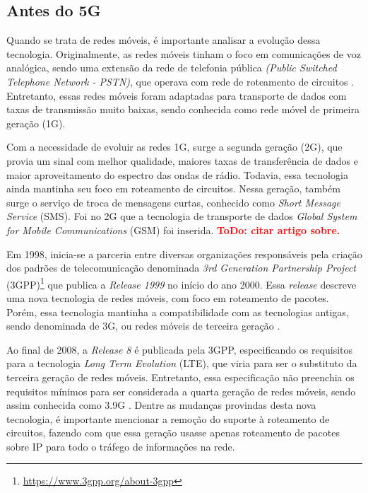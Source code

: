 \subsection{Antes do 5G}

Quando se trata de redes móveis, é importante analisar a evolução dessa tecnologia. Originalmente, as redes móveis tinham o foco em comunicações de voz analógica, sendo uma extensão da rede de telefonia pública \textit{(Public Switched Telephone Network - PSTN)}, que operava com rede de roteamento de circuitos \cite{Cardoso2020}.
Entretanto, essas redes móveis foram adaptadas para transporte de dados com taxas de transmissão muito baixas, sendo conhecida como rede móvel de primeira geração (1G).

Com a necessidade de evoluir as redes 1G, surge a segunda geração (2G), que provia um sinal com melhor qualidade, maiores taxas de transferência de dados e maior aproveitamento do espectro das ondas de rádio.
Todavia, essa tecnologia ainda mantinha seu foco em roteamento de circuitos.
Nessa geração, também surge o serviço de troca de mensagens curtas, conhecido como \textit{Short Message Service} (SMS).
Foi no 2G que a tecnologia de transporte de dados \textit{Global System for Mobile Communications} (GSM) foi inserida.
\textcolor{red}{\textbf{ToDo: citar artigo sobre.}}

Em 1998, inicia-se a parceria entre diversas organizações responsáveis pela criação dos padrões de telecomunicação denominada \textit{3rd Generation Partnership Project} (3GPP)\footnote{\url{https://www.3gpp.org/about-3gpp}} que publica a \textit{Release 1999} no início do ano 2000.
Essa \textit{release} descreve uma nova tecnologia de redes móveis, com foco em roteamento de pacotes.
Porém, essa tecnologia mantinha a compatibilidade com as tecnologias antigas, sendo denominada de 3G, ou redes móveis de terceira geração \cite{release19993gpp}.

Ao final de 2008, a \textit{Release 8} é publicada pela 3GPP, especificando os requisitos para a tecnologia \textit{Long Term Evolution} (LTE), que viria para ser o substituto da terceira geração de redes móveis.
Entretanto, essa especificação não preenchia os requisitos mínimos para ser considerada a quarta geração de redes móveis, sendo assim conhecida como 3.9G \cite{delperal2018}.
Dentre as mudanças provindas desta nova tecnologia, é importante mencionar a remoção do suporte à roteamento de circuitos, fazendo com que essa geração usasse apenas roteamento de pacotes sobre IP para todo o tráfego de informações na rede.

